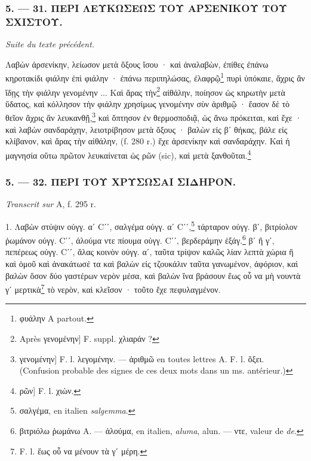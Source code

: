 \documentclass[a4paper, 11pt, oneside, polutonikogreek, french]{article}
\begin{document}
\bigskip
\centerline{\EightStarTaper}
\centerline{\EightStarTaper\EightStarTaper}
\bigskip

\subsubsection{5. --- 31. ΠΕΡΙ ΛΕΥΚΩΣΕΩΣ ΤΟΥ ΑΡΣΕΝΙΚΟΥ ΤΟΥ ΣΧΙΣΤΟΥ.}

\emph{Suite du texte précédent.}

Λαβὼν ἀρσενίκην, λείωσον μετὰ ὄξους ἴσου · καὶ ἀναλαβὼν, ἐπίθες ἐπάνω κηροτακίδι φιάλην ἐπὶ φιάλην · ἐπάνω περιπηλώσας, ἐλαφρῷ\footnote{φυάλην A partout.} πυρὶ ὑπόκαιε, ἄχρις ἂν ἴδῃς τὴν φιάλην γενομένην ... Καὶ ἄρας τὴν\footnote{Après γενομένην] F. suppl. χλιαράν ?} αἰθάλην, ποίησον ὡς κηρωτὴν μετὰ ὕδατος, καὶ κόλλησον τὴν φιάλην χρησίμως γενομένην σὺν ἀριθμῷ · ἔασον δὲ τὸ θεῖον ἄχρις ἂν λευκανθῇ,\footnote{γενομένην] F. l. λεγομένην. --- ἀριθμῶ en toutes lettres A. F. l. ὄξει. (Confusion probable des signes de ces deux mots dans un ms. antérieur.)} καὶ ὄπτησον ἐν θερμοσποδιᾷ, ὡς ἄνω πρόκειται, καὶ ἔχε · καὶ λαβὼν σανδαράχην, λειοτρίβησον μετὰ ὄξους · βαλὼν εἰς βʹ θήκας, βάλε εἰς κλίβανον, καὶ ἄρας τὴν αἰθάλην, (f. 280 r.) ἔχε ἀρσενίκην καὶ σανδαράχην. Καὶ ἡ μαγνησία οὕτω πρῶτον λευκαίνεται ὡς ρῶν (sic), καὶ μετὰ ξανθοῦται.\footnote{ρῶν] F. l. χιὼν.}

\bigskip
\centerline{\EightStarTaper}
\centerline{\EightStarTaper\EightStarTaper}
\bigskip

\subsubsection{5. --- 32. ΠΕΡΙ ΤΟΥ ΧΡΥΣΩΣΑΙ ΣΙΔΗΡΟΝ.}

\emph{Transcrit sur} A, f. 295 r.

1. Λαβὼν στύψιν οὐγγ. αʹ Cʹʹ, σαλγέμα οὐγγ. αʹ Cʹʹ,\footnote{σαλγέμα, en italien \emph{salgemma}.} τάρταρον οὐγγ. βʹ, βιτρίολον ῥωμάνον οὐγγ. Cʹʹ, ἀλούμα ντε πίουμα οὐγγ. Cʹʹ, βερδεράμην ἑξάγ.\footnote{βιτριόλω ῥωμάνω A. --- ἀλούμα, en italien, \emph{aluma}, alun. --- ντε, valeur de \emph{de}.} βʹ ἢ γʹ, πεπέρεως οὐγγ. Cʹʹ, ἅλας κοινὸν οὐγγ. αʹ, ταῦτα τρίψον καλῶς λίαν λεπτὰ χώρια ἢ καὶ ὁμοῦ καὶ ἀνακάτωσέ τα καὶ βαλὼν εἰς τζουκάλιν ταῦτα γανωμένον, ἀφόριον, καὶ βαλὼν ὅσον δύο γαστέρων νερὸν μέσα, καὶ βαλὼν ἵνα βράσουν ἕως οὗ να μὴ νουντὰ γʹ μερτικὰ\footnote{F. l. ἕως οὗ να μένουν τὰ γʹ μέρη.} τὸ νερὸν, καὶ κλεῖσον · τοῦτο ἔχε πεφυλαγμένον.
\end{document}
